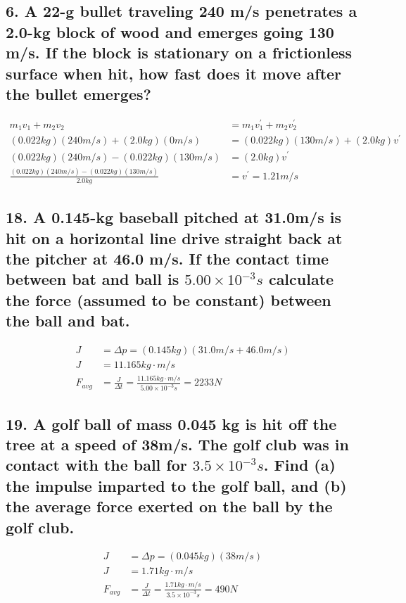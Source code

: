\documentclass[12pt,a4paper,english]{article}
\begin{document}
\begin{flushleft}
  \subsection{6. A 22-g bullet traveling 240 m/s penetrates a 2.0-kg block of wood and emerges going 130 m/s. If the block is stationary on a frictionless surface when hit, how fast does it move after the bullet emerges?}
  \begin{align*}
    m_1v_1+m_2v_2&=m_1v_1^\prime+m_2v_2^\prime
    \\
  (0.022kg)(240m/s)+(2.0kg)(0m/s)&=(0.022kg)(130m/s)+(2.0kg)v^\prime
  \\
  (0.022kg)(240m/s)-(0.022kg)(130m/s)&=(2.0kg)v^\prime
  \\
  \frac{(0.022kg)(240m/s)-(0.022kg)(130m/s)}{2.0kg}&=v^\prime=1.21m/s
  \end{align*}
  \subsection{18. A 0.145-kg baseball pitched at 31.0m/s is hit on a horizontal line drive straight back at the pitcher at 46.0 m/s. If the contact time between bat and ball is $5.00\times10^{-3}s$ calculate the force (assumed to be constant) between the ball and bat.}
  \begin{align*}
    J&=\Delta p=(0.145kg)(31.0m/s+46.0m/s)
    \\
    J&=11.165kg\cdot m/s
    \\
    F_{avg}&=\frac{J}{\Delta t}=\frac{11.165kg\cdot m/s}{5.00\times10^{-3}s}=2233N
  \end{align*}
  \subsection{19. A golf ball of mass 0.045 kg is hit off the tree at a speed of 38m/s. The golf club was in contact with the ball for $3.5\times10^{-3}s$. Find (a) the impulse imparted to the golf ball, and (b) the average force exerted on the ball by the golf club.}
  \begin{align*}
    J&=\Delta p=(0.045kg)(38m/s)
    \\
    J&=1.71kg\cdot m/s
    \\
    F_{avg}&=\frac{J}{\Delta t}=\frac{1.71kg\cdot m/s}{3.5\times10^{-3}s}=490N
  \end{align*}

\end{flushleft}
\end{document}
